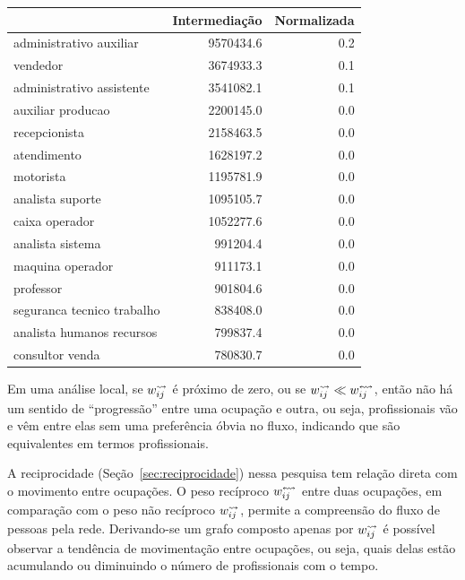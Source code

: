 \documentclass[12pt,a4paper]{article}
\begin{document}
\begin{table}[!h]
    \centering
    \begin{tabular}{l|r|r}
        \hline
        & Intermediação & Normalizada\\
        \hline
        administrativo auxiliar & 9570434.6 & 0.2\\
        \hline
        vendedor & 3674933.3 & 0.1\\
        \hline
        administrativo assistente & 3541082.1 & 0.1\\
        \hline
        auxiliar producao & 2200145.0 & 0.0\\
        \hline
        recepcionista & 2158463.5 & 0.0\\
        \hline
        atendimento & 1628197.2 & 0.0\\
        \hline
        motorista & 1195781.9 & 0.0\\
        \hline
        analista suporte & 1095105.7 & 0.0\\
        \hline
        caixa operador & 1052277.6 & 0.0\\
        \hline
        analista sistema & 991204.4 & 0.0\\
        \hline
        maquina operador & 911173.1 & 0.0\\
        \hline
        professor & 901804.6 & 0.0\\
        \hline
        seguranca tecnico trabalho & 838408.0 & 0.0\\
        \hline
        analista humanos recursos & 799837.4 & 0.0\\
        \hline
        consultor venda & 780830.7 & 0.0\\
        \hline
    \end{tabular}
\end{table}


\begin{hypothesis} \label{hip:equivalencia}
    Em uma análise local, se $w^\leadsto_{ij}$ é próximo de zero, ou se $w^\leadsto_{ij} \ll w^\leftrightsquigarrow_{ij}$, então não há um sentido de \enquote{progressão} entre uma ocupação e outra, ou seja, profissionais vão e vêm entre elas sem uma preferência óbvia no fluxo, indicando que são equivalentes em termos profissionais.
\end{hypothesis}

A reciprocidade (Seção~\ref{sec:reciprocidade}) nessa pesquisa tem relação direta com o movimento entre ocupações. O peso recíproco $w^\leftrightsquigarrow_{ij}$ entre duas ocupações, em comparação com o peso não recíproco $w^\leadsto_{ij}$, permite a compreensão do fluxo de pessoas pela rede. Derivando-se um grafo composto apenas por $w^\leadsto_{ij}$ é possível observar a tendência de movimentação entre ocupações, ou seja, quais delas estão acumulando ou diminuindo o número de profissionais com o tempo.
\end{document}
